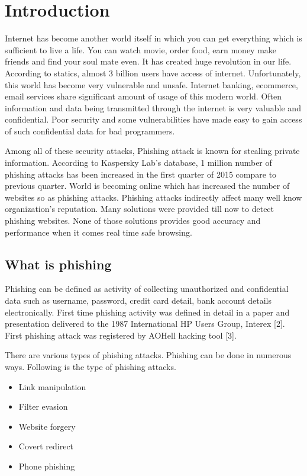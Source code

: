 \chapter{Introduction}

Internet has become another world itself in which you can get everything which is sufficient to live a life. You can watch movie, order food, earn money make friends and find your soul mate even. It has created huge revolution in our life. According to statics, almost 3 billion users have access of internet. Unfortunately, this world has become very vulnerable and unsafe. Internet banking, ecommerce, email services share significant amount of usage of this modern world. Often information and data being transmitted through the internet is very valuable and confidential. Poor security and some vulnerabilities have made easy to gain access of such confidential data for bad programmers. 

Among all of these security attacks, Phishing attack is known for stealing private information. According to Kaspersky Lab’s database, 1 million number of phishing attacks has been increased in the first quarter of 2015 compare to previous quarter.  World is becoming online which has increased the number of websites so as phishing attacks. Phishing attacks indirectly affect many well know organization’s reputation. Many solutions were provided till now to detect phishing websites. None of those solutions provides good accuracy and performance when it comes real time safe browsing. 


\section{What is phishing} 

Phishing can be defined as activity of collecting unauthorized and confidential data such as username, password, credit card detail, bank account details electronically. First time phishing activity was defined in detail in a paper and presentation delivered to the 1987 International HP Users Group, Interex [2]. First phishing attack was registered by AOHell hacking tool [3]. 

There are various types of phishing attacks. Phishing can be done in numerous ways. Following is the type of phishing attacks.

\begin{itemize}
\item Link manipulation
\item Filter evasion
\item Website forgery
\item Covert redirect
\item Phone phishing
\end{itemize}

